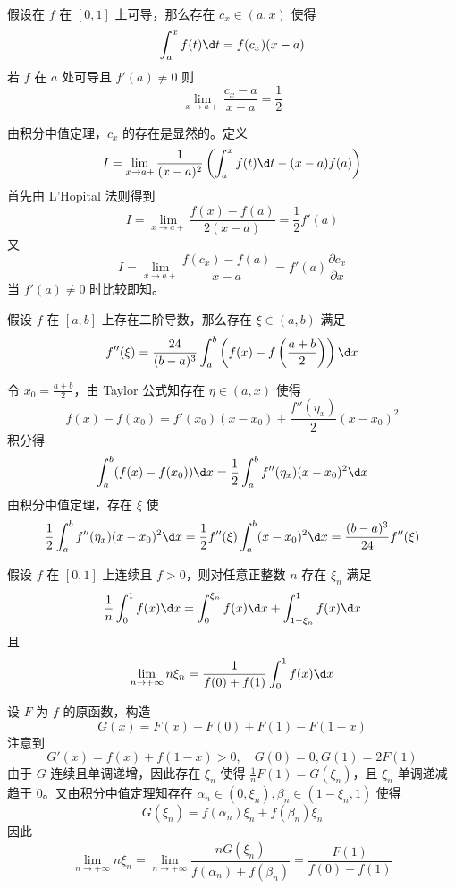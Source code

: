 \begin{problem}[000048]
假设在 $f$ 在 $[0, 1]$ 上可导，那么存在 $c_x \in (a, x)$ 使得
\[ \int_{a}^{x} f(t) \d t = f(c_x) (x - a) \]
若 $f$ 在 $a$ 处可导且 $f'(a) \neq 0$ 则
\[ \lim_{x \to a+} \frac{c_x - a}{x -a} = \frac{1}{2} \]
\end{problem}

\begin{solution}
	由积分中值定理，$c_x$ 的存在是显然的。定义
	\[ I = \lim_{x \to a+} \frac{1}{(x-a)^2} \left( \int_{a}^{x} f(t) \d t - (x - a) f(a) \right) \]
	首先由 L'Hopital 法则得到
	\[ I = \lim_{x \to a+} \frac{f(x) - f(a)}{2(x - a)} = \frac{1}{2} f'(a) \]
	又
	\[ I = \lim_{x \to a+}\frac{f(c_x) - f(a)}{x - a} = f'(a) \frac{\partial c_x}{\partial x} \]
	当 $f'(a) \neq 0$ 时比较即知。
\end{solution}

\begin{problem}[000049]
假设 $f$ 在 $[a, b]$ 上存在二阶导数，那么存在 $\xi \in (a, b)$ 满足
\[ f''(\xi) = \frac{24}{(b-a)^3} \int_{a}^{b} \left(f(x) - f\left(\frac{a+b}{2}\right)\right) \d x \]
\end{problem}

\begin{solution}
	令 $x_0 = \frac{a+b}{2}$，由 Taylor 公式知存在 $\eta \in (a, x)$ 使得
	\[ f(x) - f(x_0) = f'(x_0)(x - x_0) + \frac{f''(\eta_x)}{2} (x - x_0)^2 \]
	积分得
	\[ \int_{a}^{b} (f(x) - f(x_0)) \d x = \frac{1}{2} \int_{a}^{b} f''(\eta_x) (x - x_0)^2 \d x  \]
	由积分中值定理，存在 $\xi$ 使
	\[ \frac{1}{2} \int_{a}^{b} f''(\eta_x) (x - x_0)^2 \d x = \frac{1}{2} f''(\xi) \int_{a}^{b} (x - x_0)^2 \d x = \frac{(b-a)^3}{24} f''(\xi)   \]
\end{solution}

\begin{problem}[000050]
假设 $f$ 在 $[0, 1]$ 上连续且 $f > 0$，则对任意正整数 $n$ 存在 $\xi_n$ 满足
\[ \frac{1}{n} \int_{0}^{1} f(x) \d x = \int_{0}^{\xi_n} f(x) \d x + \int_{1 - \xi_n}^{1} f(x) \d x \]
且
\[ \lim_{n \to +\infty} n \xi_n = \frac{1}{f(0) + f(1)} \int_{0}^{1} f(x) \d x \]
\end{problem}

\begin{solution}
	设 $F$ 为 $f$ 的原函数，构造
	\[ G(x) = F(x) - F(0) + F(1) - F(1 - x) \]
	注意到
	\[ G'(x) = f(x) + f(1 - x) > 0, \quad G(0) = 0, G(1) = 2F(1) \]
	由于 $G$ 连续且单调递增，因此存在 $\xi_n$ 使得 $\frac{1}{n}F(1) = G(\xi_n)$，且 $\xi_n$ 单调递减趋于 $0$。又由积分中值定理知存在 $\alpha_n \in (0, \xi_n), \beta_n \in (1-\xi_n, 1)$ 使得
	\[ G(\xi_n) = f(\alpha_n) \xi_n + f(\beta_n) \xi_n \]
	因此
	\[ \lim_{n \to +\infty} n \xi_n = \lim_{n \to +\infty} \frac{n G(\xi_n)}{f(\alpha_n) + f(\beta_n)} = \frac{F(1)}{f(0) + f(1)} \]
\end{solution}

